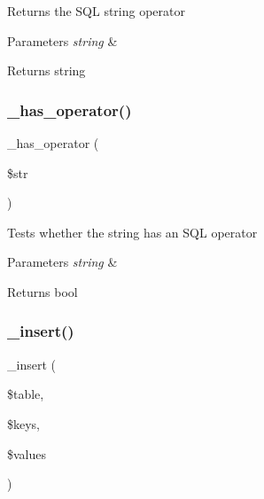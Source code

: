 Returns the S\+QL string operator


\begin{DoxyParams}{Parameters}
{\em string} & \\
\hline
\end{DoxyParams}
\begin{DoxyReturn}{Returns}
string 
\end{DoxyReturn}
\mbox{\label{class_c_i___d_b__driver_a2e0ab20a3cd2941eaa854fe0b4a81e6b}} 
\subsubsection{\texorpdfstring{\+\_\+has\+\_\+operator()}{\_has\_operator()}}
{\footnotesize\ttfamily \+\_\+has\+\_\+operator (\begin{DoxyParamCaption}\item[{}]{\$str }\end{DoxyParamCaption})\hspace{0.3cm}{\ttfamily [protected]}}

Tests whether the string has an S\+QL operator


\begin{DoxyParams}{Parameters}
{\em string} & \\
\hline
\end{DoxyParams}
\begin{DoxyReturn}{Returns}
bool 
\end{DoxyReturn}
\mbox{\label{class_c_i___d_b__driver_a69ee76b136052e0a8f06097fb388e53e}} 
\subsubsection{\texorpdfstring{\+\_\+insert()}{\_insert()}}
{\footnotesize\ttfamily \+\_\+insert (\begin{DoxyParamCaption}\item[{}]{\$table,  }\item[{}]{\$keys,  }\item[{}]{\$values }\end{DoxyParamCaption})\hspace{0.3cm}{\ttfamily [protected]}}

